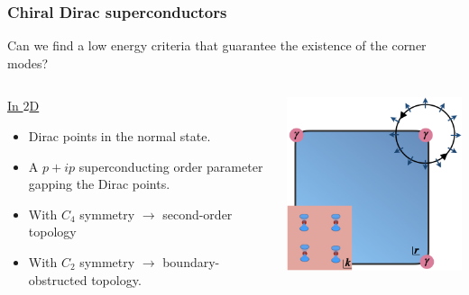 \documentclass{beamer}
\renewcommand{\(}{\left(}
\renewcommand{\)}{\right)}
\renewcommand{\[}{\left[}
\renewcommand{\]}{\right]}
\begin{document}
\begin{frame}
    \frametitle{Chiral Dirac superconductors}

    Can we find a low energy criteria that guarantee the existence of the corner modes? 
    \vspace{10pt}
    \begin{columns}
        \begin{column}{0.5\textwidth}
            \underline{In $2$D}
            \begin{itemize}
                \item Dirac points in the normal state.
                \item A $p+ip$ superconducting order parameter gapping the Dirac points.
                \item With $C_4$ symmetry $\rightarrow$ second-order topology 
                \item With $C_2$ symmetry $\rightarrow$ boundary-obstructed topology. 
            \end{itemize}
        \end{column}
        \begin{column}{0.5\textwidth}
            \centering 
            \includegraphics[scale = 0.5]{HOTSc3.png}
        \end{column}
    \end{columns}

\end{frame}
\end{document}
